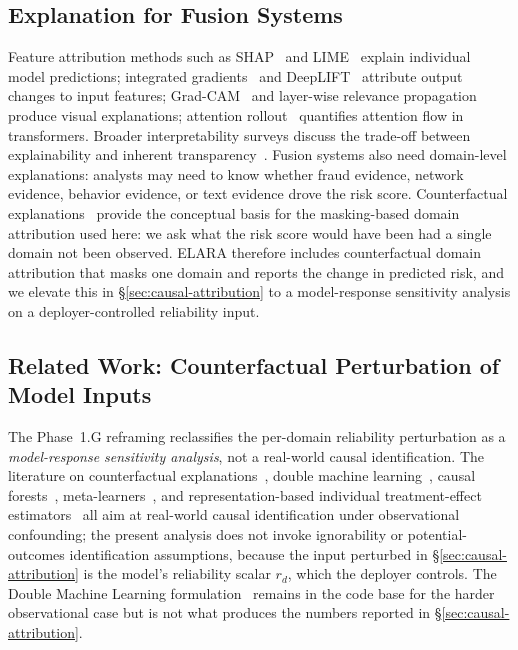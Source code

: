 \documentclass[10pt,conference]{IEEEtran}
\newcommand{\system}{ELARA}
\begin{document}
\subsection{Explanation for Fusion Systems}
Feature attribution methods such as SHAP~\cite{lundberg2017unified} and
LIME~\cite{ribeiro2016should} explain individual model predictions;
integrated gradients~\cite{sundararajan2017axiomatic} and
DeepLIFT~\cite{shrikumar2017learning} attribute output changes to input
features; Grad-CAM~\cite{selvaraju2017grad} and layer-wise relevance
propagation~\cite{bach2015pixel} produce visual explanations; attention
rollout~\cite{abnar2020quantifying} quantifies attention flow in
transformers. Broader interpretability surveys discuss the trade-off
between explainability and inherent transparency~\cite{molnar2022interpretable,rudin2019stop}.
Fusion systems also need domain-level explanations: analysts may need to
know whether fraud evidence, network evidence, behavior evidence, or text
evidence drove the risk score. Counterfactual
explanations~\cite{wachter2017counterfactual} provide the conceptual basis
for the masking-based domain attribution used here: we ask what the risk
score would have been had a single domain not been observed. \system{}
therefore includes counterfactual domain attribution that masks one domain
and reports the change in predicted risk, and we elevate this in
\S\ref{sec:causal-attribution} to a model-response sensitivity analysis
on a deployer-controlled reliability input.

\subsection{Related Work: Counterfactual Perturbation of Model Inputs}
The Phase~1.G reframing reclassifies the per-domain reliability
perturbation as a \emph{model-response sensitivity analysis}, not a
real-world causal identification. The literature on counterfactual
explanations~\cite{wachter2017counterfactual}, double machine
learning~\cite{chernozhukov2018doubleml}, causal
forests~\cite{athey2019generalized,wager2018estimation},
meta-learners~\cite{kunzel2019metalearners}, and representation-based
individual treatment-effect
estimators~\cite{shalit2017estimating} all aim at real-world causal
identification under observational confounding; the present analysis
does not invoke ignorability or potential-outcomes identification
assumptions, because the input perturbed in
§\ref{sec:causal-attribution} is the model's reliability scalar
$r_d$, which the deployer controls. The Double Machine Learning
formulation~\cite{robins1994estimation,chernozhukov2018doubleml}
remains in the code base for the harder observational case but is
not what produces the numbers reported in
§\ref{sec:causal-attribution}.
\end{document}
